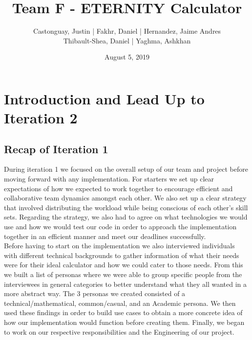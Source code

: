 \documentclass[a4paper, 12pt]{article}
\begin{document}
\title{\LARGE{\textbf{Team F - ETERNITY Calculator}}}
\author{
	Castonguay, Justin | Fakhr, Daniel | Hernandez, Jaime Andres \\ Thibault-Shea, Daniel |
	Yaghma, Ashkhan \\
}
\date{August 5, 2019}

\fancyhf{}

\clearpage\maketitle
\thispagestyle{empty} %
\pagebreak

\setcounter{page}{2} %
\fancyhf{}
\renewcommand{\headrulewidth}{2pt}
\renewcommand{\footrulewidth}{1pt}
\fancyhead[LE,RO]{\rightmark}
\tableofcontents
\pagebreak


\section{Introduction and Lead Up to Iteration 2}

\subsection{Recap of Iteration 1}

During iteration 1 we focused on the overall setup of our team and project before moving forward with any implementation. For starters we set up clear expectations of how we expected to work together to encourage efficient and collaborative team dynamics amongst each other. We also set up a clear strategy that involved distributing the workload while being conscious of each other's skill sets. Regarding the strategy, we also had to agree on what technologies we would use and how we would test our code in order to approach the implementation together in an efficient manner and meet our deadlines successfully. 
\\

Before having to start on the implementation we also interviewed individuals with different technical backgrounds to gather information of what their needs were for their ideal calculator and how we could cater to those needs. From this we built a list of personas where we were able to group specific people from the interviewees in general categories to better understand what they all wanted in a more abstract way. The 3 personas we created consisted of a technical/mathematical, common/casual, and an Academic persona. We then used these findings in order to build use cases to obtain a more concrete idea of how our implementation would function before creating them. Finally, we began to work on our respective responsibilities and the Engineering of our project. 
\end{document}
